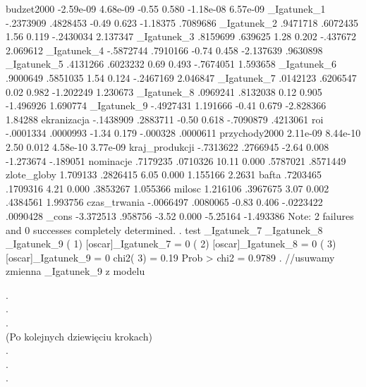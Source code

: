 \begin{stlog}
    budzet2000 {\VBAR}  -2.59e-09   4.68e-09    -0.55   0.580    -1.18e-08    6.57e-09
   _Igatunek_1 {\VBAR}  -.2373909   .4828453    -0.49   0.623     -1.18375    .7089686
   _Igatunek_2 {\VBAR}   .9471718   .6072435     1.56   0.119    -.2430034    2.137347
   _Igatunek_3 {\VBAR}   .8159699    .639625     1.28   0.202     -.437672    2.069612
   _Igatunek_4 {\VBAR}  -.5872744   .7910166    -0.74   0.458    -2.137639    .9630898
   _Igatunek_5 {\VBAR}   .4131266   .6023232     0.69   0.493    -.7674051    1.593658
   _Igatunek_6 {\VBAR}   .9000649   .5851035     1.54   0.124    -.2467169    2.046847
   _Igatunek_7 {\VBAR}   .0142123   .6206547     0.02   0.982    -1.202249    1.230673
   _Igatunek_8 {\VBAR}   .0969241   .8132038     0.12   0.905    -1.496926    1.690774
   _Igatunek_9 {\VBAR}  -.4927431   1.191666    -0.41   0.679    -2.828366     1.84288
   ekranizacja {\VBAR}  -.1438909   .2883711    -0.50   0.618    -.7090879    .4213061
           roi {\VBAR}  -.0001334   .0000993    -1.34   0.179     -.000328    .0000611
 przychody2000 {\VBAR}   2.11e-09   8.44e-10     2.50   0.012     4.58e-10    3.77e-09
kraj_produkcji {\VBAR}  -.7313622   .2766945    -2.64   0.008    -1.273674    -.189051
     nominacje {\VBAR}   .7179235   .0710326    10.11   0.000     .5787021    .8571449
   zlote_globy {\VBAR}   1.709133   .2826415     6.05   0.000     1.155166      2.2631
         bafta {\VBAR}   .7203465   .1709316     4.21   0.000     .3853267    1.055366
        milosc {\VBAR}   1.216106   .3967675     3.07   0.002     .4384561    1.993756
  czas_trwania {\VBAR}  -.0066497   .0080065    -0.83   0.406    -.0223422    .0090428
         _cons {\VBAR}  -3.372513    .958756    -3.52   0.000     -5.25164   -1.493386
Note: 2 failures and 0 successes completely determined.
{\smallskip}
. test _Igatunek_7 _Igatunek_8 _Igatunek_9
{\smallskip}
 ( 1)  [oscar]_Igatunek_7 = 0
 ( 2)  [oscar]_Igatunek_8 = 0
 ( 3)  [oscar]_Igatunek_9 = 0
{\smallskip}
           chi2(  3) =    0.19
         Prob > chi2 =    0.9789
{\smallskip}
. //usuwamy zmienna _Igatunek_9 z modelu

\end{stlog}
\vspace{1cm}
{\centering .\\.\\.\\(Po kolejnych dziewięciu krokach)\\.\\.\\.\\}
